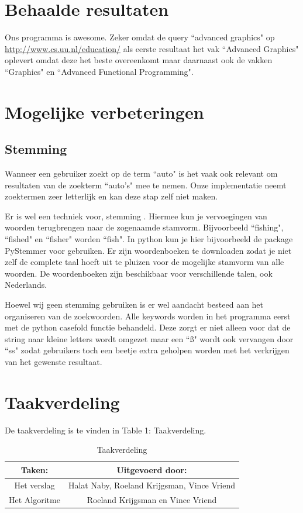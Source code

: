 \documentclass[12pt,a4paper]{article}
\begin{document}
\section{Behaalde resultaten}
Ons programma is awesome. Zeker omdat de query ``advanced graphics" op \url{http://www.cs.uu.nl/education/} als eerste resultaat het vak ``Advanced Graphics" oplevert omdat deze het beste overeenkomt maar daarnaast ook de vakken ``Graphics" en ``Advanced Functional Programming".

\section{Mogelijke verbeteringen}
\subsection{Stemming}
Wanneer een gebruiker zoekt op de term ``auto" is het vaak ook relevant om resultaten van de zoekterm ``auto's" mee te nemen. Onze implementatie neemt zoektermen zeer letterlijk en kan deze stap zelf niet maken.
\vspace{1pc}

Er is wel een techniek voor, stemming \cite{5}.  Hiermee kun je vervoegingen van woorden terugbrengen naar de zogenaamde stamvorm. Bijvoorbeeld ``fishing", ``fished" en ``fisher" worden ``fish". In python kun je hier bijvoorbeeld de package PyStemmer voor gebruiken. Er zijn woordenboeken te downloaden zodat je niet zelf de complete taal hoeft uit te pluizen voor de mogelijke stamvorm van alle woorden. De woordenboeken zijn beschikbaar voor verschillende talen, ook Nederlands.
\vspace{1pc}

Hoewel wij geen stemming gebruiken is er wel aandacht besteed aan het organiseren van de zoekwoorden. Alle keywords worden in het programma eerst met de python casefold functie behandeld. Deze zorgt er niet alleen voor dat de string naar kleine letters wordt omgezet maar een ``{\ss}" wordt ook vervangen door ``ss" zodat gebruikers toch een beetje extra geholpen worden met het verkrijgen van het gewenste resultaat.

\section{Taakverdeling}
De taakverdeling is te vinden in Table 1: Taakverdeling.

\begin{table}
\caption{Taakverdeling}
\label{taakverdling}
\begin{center}
\begin{tabular}{|c||c|}
\hline
Taken: & Uitgevoerd door:\\
\hline
Het verslag & Halat Naby, Roeland Krijgsman, Vince Vriend\\
\hline
Het Algoritme &  Roeland Krijgsman en Vince Vriend\\
\hline
\end{tabular}
\end{center}
\end{table}



\end{document}
